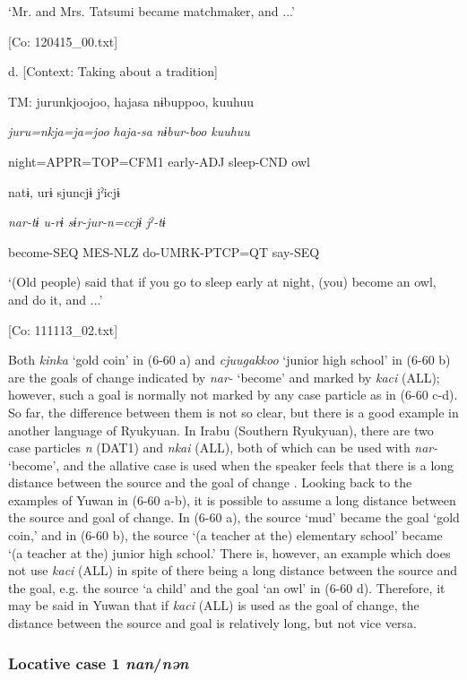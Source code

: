       ‘Mr. and Mrs. Tatsumi became matchmaker, and ...’

      [Co: 120415\_00.txt]

  d.  [Context: Taking about a tradition]

    TM:  jurunkjoojoo,  hajasa  nɨbuppoo,  kuuhuu

      \textit{juru=nkja=ja=joo}  \textit{haja-sa}  \textit{nɨbur-boo}  \textit{kuuhuu}

      night=APPR=TOP=CFM1  early-ADJ  sleep-CND  owl

      natɨ,  urɨ  sjuncjɨ  jˀicjɨ

      \textit{nar{}-tɨ  u-rɨ  sɨr-jur-n=ccjɨ  jˀ-tɨ}

      become-SEQ  MES-NLZ  do-UMRK-PTCP=QT  say-SEQ

      ‘(Old people) said that if you go to sleep early at night, (you) become an owl, and do it, and ...’

      [Co: 111113\_02.txt]

Both \textit{kinka} ‘gold coin’ in (6-60 a) and \textit{cjuugakkoo} ‘junior high school’ in (6-60 b) are the goals of change indicated by \textit{nar-} ‘become’ and marked by \textit{kaci} (ALL); however, such a goal is normally not marked by any case particle as in (6-60 c-d). So far, the difference between them is not so clear, but there is a good example in another language of Ryukyuan. In Irabu (Southern Ryukyuan), there are two case particles \textit{n} (DAT1) and \textit{nkai} (ALL), both of which can be used with \textit{nar-} ‘become’, and the allative case is used when the speaker feels that there is a long distance between the source and the goal of change \citep{Shimoji2013}. Looking back to the examples of Yuwan in (6-60 a-b), it is possible to assume a long distance between the source and goal of change. In (6-60 a), the source ‘mud’ became the goal ‘gold coin,’ and in (6-60 b), the source ‘(a teacher at the) elementary school’ became ‘(a teacher at the) junior high school.’ There is, however, an example which does not use \textit{kaci} (ALL) in spite of there being a long distance between the source and the goal, e.g. the source ‘a child’ and the goal ‘an owl’ in (6-60 d). Therefore, it may be said in Yuwan that if \textit{kaci} (ALL) is used as the goal of change, the distance between the source and goal is relatively long, but not vice versa.

\subsubsection{Locative case 1 \textit{nan}/\textit{nən}}


